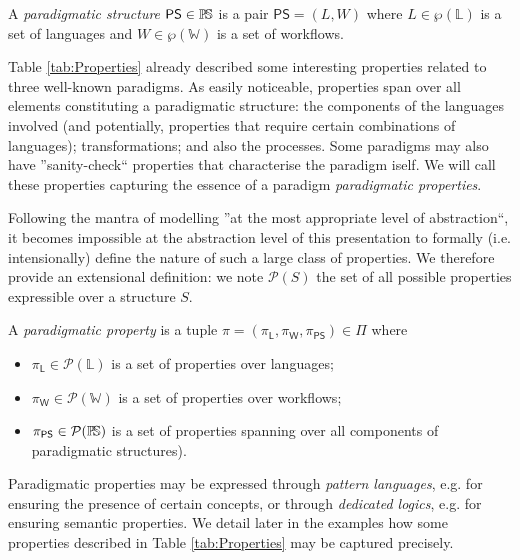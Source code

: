 \begin{Definition}
   A \emph{paradigmatic structure} $\mathsf{PS}\in \mathbb{P}\!\mathbb{S}$ is a pair $\mathsf{PS} 
= (L, W)$ where $L\in \wp(\mathbb{L})$ is a set of languages and 
$W \in \wp(\mathbb{W})$ is a set of workflows.
\end{Definition}

Table \ref{tab:Properties} already described some interesting properties 
related to three well-known paradigms. As easily noticeable, properties span 
over all elements constituting a paradigmatic structure: the components of the 
languages involved (and potentially, properties that require certain 
combinations of languages); transformations; and also the processes. Some 
paradigms may also have ''sanity-check`` properties that characterise the 
paradigm iself. We will call these properties capturing the essence of a 
paradigm \emph{paradigmatic properties}.

Following the mantra of modelling ''at the most appropriate 
level of abstraction``, it becomes impossible at the abstraction level of this 
presentation to formally (i.e. intensionally) define the nature of such a large 
class of properties. We therefore provide an extensional definition: we note 
$\mathcal{P}(S)$ the set of all possible properties expressible over a 
structure $S$. 


\begin{Definition}
   A \emph{paradigmatic property} is a tuple 
$\pi = (\pi_{\mathsf{L}},\pi_{\mathsf{W}},\pi_{\mathsf{PS}}) \in \Pi$ where
\begin{itemize}
   \item $\pi_{\mathsf{L}} \in \mathcal{P}(\mathbb{L})$ is a set of properties 
over languages;
   \item $\pi_{\mathsf{W}} \in \mathcal{P}(\mathbb{W})$ is a set of properties 
over workflows;
   \item $\pi_{\mathsf{PS}}\in\mathcal{P}(\mathbb{P}\!\mathbb{S})$ is a set of 
properties spanning over all components of paradigmatic structures).
\end{itemize}
\end{Definition}
\noindent
Paradigmatic properties may be expressed through \emph{pattern languages}, e.g. 
for ensuring the presence of certain concepts, or through \emph{dedicated 
logics}, e.g. for ensuring semantic properties. We detail later in the examples 
how some properties described in Table \ref{tab:Properties} may be captured 
precisely.


